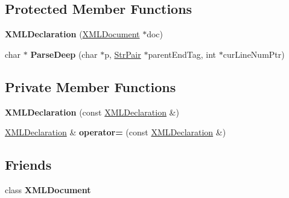 \subsection*{Protected Member Functions}
\begin{DoxyCompactItemize}
\item 
\mbox{\label{classtinyxml2_1_1XMLDeclaration_aef9586f2ce5df5feba74dde49a242b06}} 
{\bfseries X\+M\+L\+Declaration} (\mbox{\hyperlink{classtinyxml2_1_1XMLDocument}{X\+M\+L\+Document}} $\ast$doc)
\item 
\mbox{\label{classtinyxml2_1_1XMLDeclaration_a85e217f63cf47c65f81a44d360927cf7}} 
char $\ast$ {\bfseries Parse\+Deep} (char $\ast$p, \mbox{\hyperlink{classtinyxml2_1_1StrPair}{Str\+Pair}} $\ast$parent\+End\+Tag, int $\ast$cur\+Line\+Num\+Ptr)
\end{DoxyCompactItemize}
\subsection*{Private Member Functions}
\begin{DoxyCompactItemize}
\item 
\mbox{\label{classtinyxml2_1_1XMLDeclaration_a5229cc0b31f034f93289af27ec3e2836}} 
{\bfseries X\+M\+L\+Declaration} (const \mbox{\hyperlink{classtinyxml2_1_1XMLDeclaration}{X\+M\+L\+Declaration}} \&)
\item 
\mbox{\label{classtinyxml2_1_1XMLDeclaration_a79eb518c2c2b1b99a122a5d5a308b7ee}} 
\mbox{\hyperlink{classtinyxml2_1_1XMLDeclaration}{X\+M\+L\+Declaration}} \& {\bfseries operator=} (const \mbox{\hyperlink{classtinyxml2_1_1XMLDeclaration}{X\+M\+L\+Declaration}} \&)
\end{DoxyCompactItemize}
\subsection*{Friends}
\begin{DoxyCompactItemize}
\item 
\mbox{\label{classtinyxml2_1_1XMLDeclaration_a4eee3bda60c60a30e4e8cd4ea91c4c6e}} 
class {\bfseries X\+M\+L\+Document}
\end{DoxyCompactItemize}
